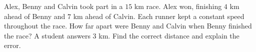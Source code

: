 Alex, Benny and Calvin took part in a $15$ km race. Alex won, finishing $4$ km ahead of Benny and $7$ km ahead of Calvin. Each runner kept a constant speed throughout the race. How far apart were Benny and Calvin when Benny finished the race? A student answers $3$ km. Find the correct distance and explain the error.
